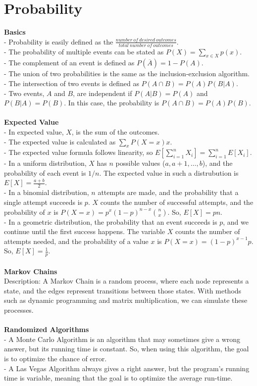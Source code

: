\documentclass[12pt]{report}
\begin{document}
\section{Probability}
\textbf{Basics}\\
- Probability is easily defined as the \(\frac{number\:of\:desired\:outcomes}{total\:number\:of\:outcomes}\).\\
- The probability of multiple events can be stated as \(P(X)=\sum_{x\in{X}}^{}{p(x)}\).\\
- The complement of an event is defined as \(P(\overline{A})=1-P(A)\).\\
- The union of two probabilities is the same as the inclusion-exclusion algorithm.\\
- The intersection of two events is defined as \(P(A\cap{B})=P(A)P(B|A)\).\\
- Two events, \(A\) and \(B\), are independent if \(P(A|B)=P(A)\) and \(P(B|A)=P(B)\). In this case, the probability is \(P(A\cap{B})=P(A)P(B)\).\\\\
\textbf{Expected Value}\\
- In expected value, \(X\), is the sum of the outcomes.\\
- The expected value is calculated as \(\sum_{x}^{}{P(X=x)x}\).\\
- The expected value formula follows linearity, so \(E[\sum_{i=1}^{n}{X_i}]=\sum_{i=1}^{n}{E[X_i]}\).\\
- In a uniform distribution, \(X\) has \(n\) possible values (\(a,a+1,\dots,b\)), and the probability of each event is \(1/n\). The expected value in such a distrubution is \(E[X]=\frac{a+b}{2}\).\\
- In a binomial distribution, \(n\) attempts are made, and the probability that a single attempt succeeds is \(p\). \(X\) counts the number of successful attempts, and the probability of \(x\) is \(P(X=x)=p^x(1-p)^{n-x}{n\choose{x}}\). So, \(E[X]=pn\).\\
- In a geometric distribution, the probability that an event succeeds is \(p\), and we continue until the first success happens. The variable \(X\) counts the number of attempts needed, and the probability of a value \(x\) is \(P(X=x)=(1-p)^{x-1}p\). So, \(E[X]=\frac{1}{p}\).\\\\
\textbf{Markov Chains}\\
Description: A Markov Chain is a random process, where each node represents a state, and the edges represent transitions between those states. With methods such as dynamic programming and matrix multiplication, we can simulate these processes.\\\\
\textbf{Randomized Algorithms}\\
- A Monte Carlo Algorithm is an algorithm that may sometimes give a wrong answer, but its running time is constant. So, when using this algorithm, the goal is to optimize the chance of error.\\
- A Las Vegas Algorithm always gives a right answer, but the program's running time is variable, meaning that the goal is to optimize the average run-time.\\
\end{document}
